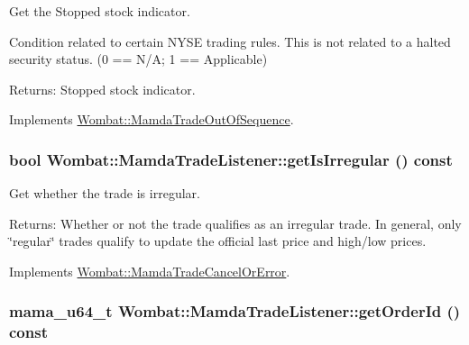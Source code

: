Get the Stopped stock indicator. 

Condition related to certain NYSE trading rules. This is not related to a halted security status. (0 == N/A; 1 == Applicable)

\begin{Desc}
\item[Returns:]Stopped stock indicator. \end{Desc}


Implements \hyperlink{classWombat_1_1MamdaTradeOutOfSequence_648c384ede932f120d0005dd9419fa32}{Wombat::Mamda\-Trade\-Out\-Of\-Sequence}.\hypertarget{classWombat_1_1MamdaTradeListener_1a5b54d3d63c62bf8720cc29dd40b25a}{
\subsubsection[getIsIrregular]{\setlength{\rightskip}{0pt plus 5cm}bool Wombat::Mamda\-Trade\-Listener::get\-Is\-Irregular () const}}
\label{classWombat_1_1MamdaTradeListener_1a5b54d3d63c62bf8720cc29dd40b25a}


Get whether the trade is irregular. 

\begin{Desc}
\item[Returns:]Whether or not the trade qualifies as an irregular trade. In general, only \char`\"{}regular\char`\"{} trades qualify to update the official last price and high/low prices. \end{Desc}


Implements \hyperlink{classWombat_1_1MamdaTradeCancelOrError_a066daf6f361384f809a91dd4085149e}{Wombat::Mamda\-Trade\-Cancel\-Or\-Error}.\hypertarget{classWombat_1_1MamdaTradeListener_46c9913f3bc9f7e31f07afa76eaed7ff}{
\subsubsection[getOrderId]{\setlength{\rightskip}{0pt plus 5cm}mama\_\-u64\_\-t Wombat::Mamda\-Trade\-Listener::get\-Order\-Id () const}}
\label{classWombat_1_1MamdaTradeListener_46c9913f3bc9f7e31f07afa76eaed7ff}


